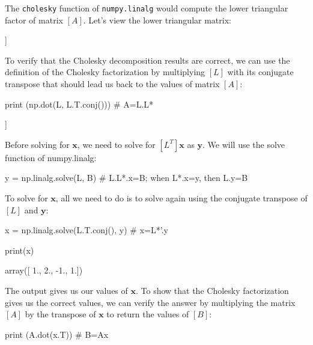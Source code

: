The \texttt{cholesky} function of \texttt{numpy.linalg} would compute the lower triangular factor of matrix $[A]$. Let's view the lower triangular matrix:

\begin{ipython}
print (L}
\end{ipython}
\begin{ioutput}
[[ 3.16227766  0.         0.         0.        ]
 [-0.31622777  3.3015148  0.         0.        ] 
 [ 0.63245553 -0.24231301 3.08889696 0.        ] 
 [ 0.          0.9086738 -0.25245792 2.6665665 ]]
\end{ioutput}

To verify that the Cholesky decomposition results are correct, we can use the definition of the Cholesky factorization by multiplying $[L]$ with its conjugate transpose that should lead us back to the values of matrix $[A]$:

\begin{ipython}
print (np.dot(L, L.T.conj())) # A=L.L* 
\end{ipython}
\begin{ioutput}
[[ 10. -1.  2   0.]
 [ -1. 11. -1.  3.] 
 [  2. -1. 10. -1.] 
 [  0.  3. -1.  8.]]
\end{ioutput}

Before solving for $\boldsymbol{x}$, we need to solve for $[L^T]\boldsymbol{x}$ as $\boldsymbol{y}$. We will use the solve function of numpy.linalg:

\begin{ipython}
y = np.linalg.solve(L, B) # L.L*.x=B; when L*.x=y, then L.y=B
\end{ipython}

To solve for $\boldsymbol{x}$, all we need to do is to solve again using the conjugate transpose of $[L]$ and $\boldsymbol{y}$:

\begin{ipython}
x = np.linalg.solve(L.T.conj(), y) # x=L*'.y

print(x)
\end{ipython}
\begin{ioutput}
array([ 1.,  2., -1.,  1.])
\end{ioutput}
The output gives us our values of $\boldsymbol{x}$. To show that the Cholesky factorization gives us the correct values, we can verify the answer by multiplying the matrix $[A]$ by the transpose of $\boldsymbol{x}$ to return the values of $[B]$:
\begin{ipython}
print (A.dot(x.T)) # B=Ax 
\end{ipython}
\begin{ioutput}
[  6.  25. -11.  15.]
\end{ioutput}


